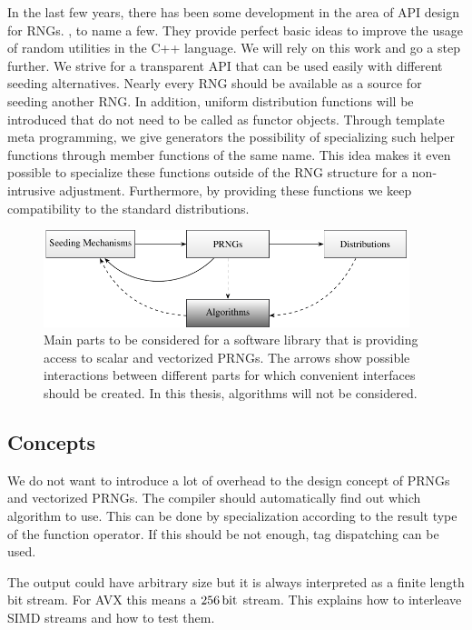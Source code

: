 \documentclass{stdlocal}
\begin{document}
  In the last few years, there has been some development in the area of API design for RNGs.
  \textcite{oneill-blog-api,oneill-blog-rd,cpp-std-seeding,cpp-std-random}, to name a few.
  They provide perfect basic ideas to improve the usage of random utilities in the C++ language.
  We will rely on this work and go a step further.
  We strive for a transparent API that can be used easily with different seeding alternatives.
  Nearly every RNG should be available as a source for seeding another RNG.
  In addition, uniform distribution functions will be introduced that do not need to be called as functor objects.
  Through template meta programming, we give generators the possibility of specializing such helper functions through member functions of the same name.
  This idea makes it even possible to specialize these functions outside of the RNG structure for a non-intrusive adjustment.
  Furthermore, by providing these functions we keep compatibility to the standard distributions.

  \begin{figure}
    \center
    \includegraphics[width=0.95\textwidth]{figures/api_parts.pdf}
    \caption[Main Parts of the API Design]{
      Main parts to be considered for a software library that is providing access to scalar and vectorized PRNGs.
      The arrows show possible interactions between different parts for which convenient interfaces should be created.
      In this thesis, algorithms will not be considered.
    }
    \label{fig:api-parts}
  \end{figure}

  \subsection{Concepts} %
  \label{sub:prng_concept}
    We do not want to introduce a lot of overhead to the design concept of PRNGs and vectorized PRNGs.
    The compiler should automatically find out which algorithm to use.
    This can be done by specialization according to the result type of the function operator.
    If this should be not enough, tag dispatching can be used.

    The output could have arbitrary size but it is always interpreted as a finite length bit stream.
    For AVX this means a $256\, \mathrm{bit}$ stream.
    This explains how to interleave SIMD streams and how to test them.
\end{document}
